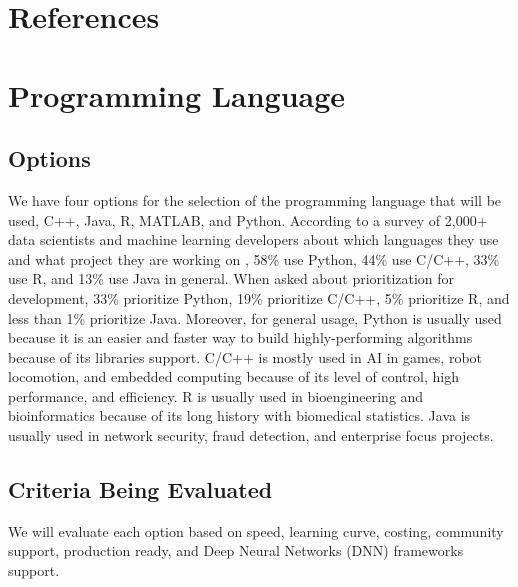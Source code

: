 \documentclass[onecolumn, draftclsnofoot,10pt, compsoc]{IEEEtran}
\begin{document}
\section{References}
\let\oldaddcontentsline\addcontentsline%
\renewcommand{\addcontentsline}[3]{}%
  

\let\addcontentsline\oldaddcontentsline%


\section{Programming Language}

\subsection{Options}
We have four options for the selection of the programming language that will be used, C++, Java, R, MATLAB, and Python. According to a survey of 2,000+ data scientists and machine learning developers about which languages they use and what project they are working on \cite{pl1}, 58\% use Python, 44\% use C/C++, 33\% use R, and 13\% use Java in general. When asked about prioritization for development, 33\% prioritize Python, 19\% prioritize C/C++, 5\% prioritize R, and less than 1\% prioritize Java. Moreover, for general usage, Python is usually used because it is an easier and faster way to build highly-performing algorithms because of its libraries support. C/C++ is mostly used in AI in games, robot locomotion, and embedded computing because of its level of control, high performance, and efficiency. R is usually used in bioengineering and bioinformatics because of its long history with biomedical statistics. Java is usually used in network security, fraud detection, and enterprise focus projects.

\subsection{Criteria Being Evaluated}
We will evaluate each option based on speed, learning curve, costing, community support, production ready, and Deep Neural Networks (DNN) frameworks support.
\end{document}
